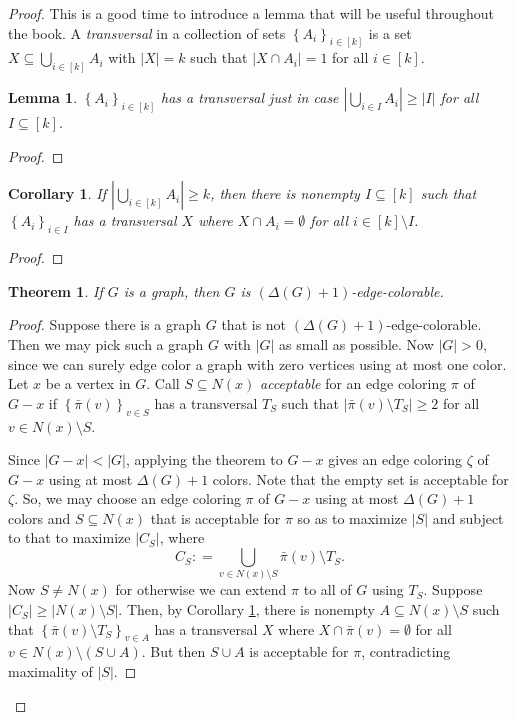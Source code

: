 \documentclass{amsbook}
\theoremstyle{plain}
\newtheorem{corollary}{Corollary}
\newtheorem{lemma}{Lemma}
\newtheorem{theorem}{Theorem}
\numberwithin{equation}{chapter}
\newcommand{\set}[1]{\left\{ #1 \right\}}
\newcommand{\card}[1]{\left|#1\right|}
\newcommand{\irange}[1]{\left[#1\right]}
\newcommand{\parens}[1]{\left( #1 \right)}
\newcommand{\DefinedAs}{\mathrel{\mathop:}=}
\begin{document}
\begin{proof}
This is a good time to introduce a lemma that will be useful throughout the book.  
A \emph{transversal} in a collection of sets $\set{A_i}_{i \in \irange{k}}$ is a set $X \subseteq \bigcup_{i \in \irange{k}} A_i$ with $\card{X} = k$ such that $\card{X \cap A_i} = 1$
for all $i \in \irange{k}$.
\begin{lemma}
$\set{A_i}_{i \in \irange{k}}$ has a transversal just in case $\card{\bigcup_{i \in I} A_i} \ge \card{I}$ for all $I \subseteq \irange{k}$.
\end{lemma}
\begin{proof}
\end{proof}

\begin{corollary}\label{TransversalCorollary}
If $\card{\bigcup_{i \in \irange{k}} A_i} \ge k$, then there is nonempty $I \subseteq \irange{k}$ such that $\set{A_i}_{i \in I}$ has a transversal $X$ where $X \cap A_i = \emptyset$
for all $i \in \irange{k} \setminus I$.
\end{corollary}
\begin{proof}
\end{proof}

\begin{theorem}
If $G$ is a graph, then $G$ is $\parens{\Delta(G) + 1}$-edge-colorable.
\end{theorem}
\begin{proof}
Suppose there is a graph $G$ that is not $(\Delta(G) + 1)$-edge-colorable.  Then we may pick such a graph $G$ with $\card{G}$ as small as possible.
Now $\card{G} > 0$, since we can surely edge color a graph with zero vertices using at most one color. Let $x$ be a vertex in $G$.   Call $S\subseteq N(x)$ \emph{acceptable} for 
an edge coloring $\pi$ of $G-x$ if $\set{\bar{\pi}(v)}_{v \in S}$ has a transversal $T_S$ such that $\card{\bar{\pi}(v) \setminus T_S} \ge 2$ for all $v \in N(x)\setminus S$.

Since $\card{G-x} < \card{G}$, applying the theorem to $G-x$ gives an edge coloring $\zeta$ of $G-x$ using at most $\Delta(G) + 1$ colors. 
Note that the empty set is acceptable for $\zeta$.  So, we may choose an edge coloring $\pi$ of $G-x$ using at most $\Delta(G) + 1$ colors and $S\subseteq N(x)$ 
that is acceptable for $\pi$ so as to maximize $\card{S}$ and subject to that to maximize $\card{C_S}$, where
\[C_S \DefinedAs \bigcup_{v \in N(x) \setminus S} \bar{\pi}(v) \setminus T_S.\]
Now $S \neq N(x)$ for otherwise we can extend $\pi$ to all of $G$ using $T_S$.  Suppose $\card{C_S}\ge \card{N(x) \setminus S}$.
Then, by Corollary \ref{TransversalCorollary}, there is nonempty $A \subseteq N(x) \setminus S$ such that $\set{\bar{\pi}(v)\setminus T_S}_{v \in A}$ has
a transversal $X$ where $X \cap \bar{\pi}(v) = \emptyset$ for all $v \in N(x) \setminus \parens{S \cup A}$.  But then $S\cup A$ is acceptable for $\pi$, contradicting
maximality of $\card{S}$.  


\end{proof}
\end{proof}
\end{document}
